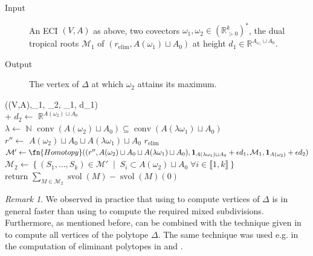 \documentclass[a4paper]{article}
\theoremstyle{remark}
\newtheorem{remark}{Remark}
\newcommand{\setdes}[2]{\left\{#1\;\middle|\;#2\right\}}
\def\NN{\mathbb{N}}
\def\RR{\mathbb{R}}
\newcommand{\irng}[1]{\llbracket #1 \rrbracket}
\DeclareMathOperator{\svol}{svol}
\DeclareMathOperator{\Conv}{conv}
\begin{document}
\begin{algorithm}
  \caption{Computing a vertex of $\Delta$}
  \label{alg:suppfunc}
  \begin{description}
  \item[Input] An ECI $(V,A)$ as above, two covectors
    $\omega_1,\omega_2\in (\RR_{>0}^{k})^{*}$, the dual tropical roots
    $\mathcal{M}_1$ of $(r_{\text{elim}},A(\omega_1)\sqcup A_0)$ at height
    $d_1\in \RR^{A_{\omega_1}\sqcup A_0}$.
  \item[Output] The vertex of $\Delta$ at which
    $\omega_2$ attains its maximum.
  \end{description}
  \begin{pseudo}
     ((V,A),\omega_1, \omega_2, _1, d_1)\\+
    $d_2 \gets $  $\RR^{A(\omega_2)\sqcup A_0}$\\
    $\lambda\gets $  $\NN$  $\Conv(A(\omega_2)\sqcup A_0)\subseteq \Conv(A(\lambda \omega_1)\sqcup A_0)$\\
    $r''\gets$  $A(\omega_2)\sqcup A_0\sqcup A(\lambda \omega_1)\sqcup A_0$  $r_{\text{elim}}$ \\
    $\mathcal{M}'\gets \fn{Homotopy}((r'',A(\omega_2)\sqcup A_0\sqcup A(\lambda \omega_1)\sqcup A_0),\mathbf{1}_{A(\lambda \omega_1)\sqcup A_0}+\epsilon d_1,\mathcal{M}_1,\mathbf{1}_{A(\omega_2)} + \epsilon d_2)$\\
    $\mathcal{M}_2 \gets \setdes{(S_1,\dots,S_k)\in \mathcal{M}'}{S_i\subset A(\omega_2)\sqcup A_0 \; \forall i \in \irng{1,k}}$\\
    return $\sum_{M\in \mathcal{M}_2}\svol(M)-\svol(M)(0)$\\
  \end{pseudo}
\end{algorithm}

\begin{remark}
  \label{rem:allverts}
  We observed in practice that using  to compute
  vertices of $\Delta$ is in general faster than using  to
  compute the required mixed subdivisions. Furthermore, as mentioned
  before,  can be combined with the technique given
  in \cite{hugginsIB4eSoftwareFramework2006} to compute all vertices
  of the polytope $\Delta$. The same technique was used e.g. in the
  computation of eliminant polytopes in
  \cite{mohrComputationNewtonPolytopes2025} and
  \cite{roseTropicalImplicitizationRevisited2025}.
\end{remark}
\end{document}
